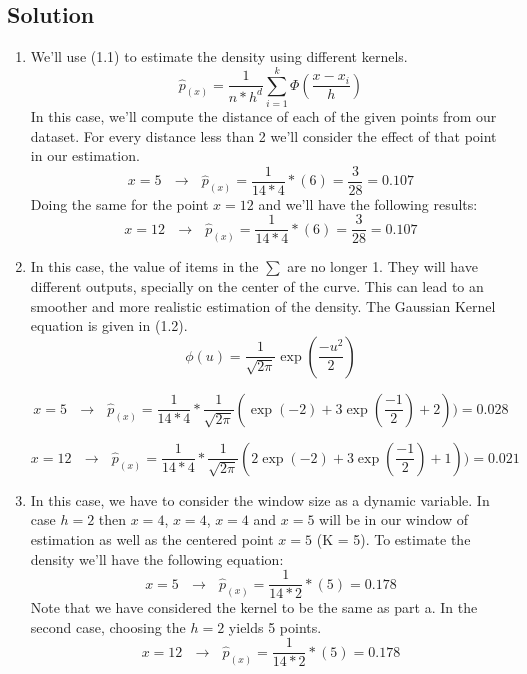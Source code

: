 \documentclass[12pt]{article}
\numberwithin{equation}{section}
\numberwithin{table}{section}
\numberwithin{figure}{section}
\begin{document}
\subsection*{Solution}
\begin{enumerate}[label=(\alph*)]
	\item We'll use (1.1) to estimate the density using different kernels.
	\begin{equation}
	\hat{p}_{(x)} = \frac{1}{n*h^d} \sum_{i = 1}^{k}\Phi(\frac{x - x_i}{h})
	\end{equation}
	In this case, we'll compute the distance of each of the given points from our dataset. For every distance less than 2 we'll consider the effect of that point in our estimation.
	$$
		x = 5\ \ \ \rightarrow\ \ \ \hat{p}_{(x)} = \frac{1}{14 * 4} * (6) = \frac{3}{28} = 0.107
	$$
	Doing the same for the point $x = 12$ and we'll have the following results:
	$$
		x = 12\ \ \ \rightarrow\ \ \ \hat{p}_{(x)} = \frac{1}{14 * 4} * (6) = \frac{3}{28} = 0.107
	$$
	
	\item In this case, the value of items in the $\sum$ are no longer 1. They will have different outputs, specially on the center of the curve. This can lead to an smoother and more realistic estimation of the density. The Gaussian Kernel equation is given in (1.2).
	\begin{equation}
		\phi(u) = \frac{1}{\sqrt{2\pi}}\exp(\frac{-u^2}{2})
	\end{equation}
	
	$$
		x = 5\ \ \ \rightarrow\ \ \ \hat{p}_{(x)} = \frac{1}{14 * 4} * \frac{1}{\sqrt{2\pi}} (\exp(-2) + 3\exp(\frac{-1}{2}) + 2)) = 0.028
	$$
	
	$$
		x = 12\ \ \ \rightarrow\ \ \ \hat{p}_{(x)} = \frac{1}{14 * 4} * \frac{1}{\sqrt{2\pi}} (2\exp(-2) + 3\exp(\frac{-1}{2}) + 1)) = 0.021
	$$
	
	\item In this case, we have to consider the window size as a dynamic variable. In case $h = 2$ then $x = 4$, $x = 4$, $x = 4$ and $x = 5$ will be in our window of estimation as well as the centered point $x = 5$ (K = 5). To estimate the density we'll have the following equation:
	$$
		x = 5\ \ \ \rightarrow\ \ \ \hat{p}_{(x)} = \frac{1}{14 * 2} * (5) = 0.178
	$$
	Note that we have considered the kernel to be the same as part a. In the second case, choosing the $h = 2$ yields 5 points.
	$$
	x = 12\ \ \ \rightarrow\ \ \ \hat{p}_{(x)} = \frac{1}{14 * 2} * (5) = 0.178
	$$
\end{enumerate}
\end{document}
